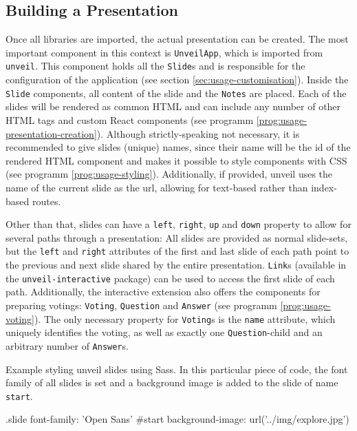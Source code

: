\subsection{Building a Presentation}
\label{sec:usage-components}

Once all libraries are imported, the actual presentation can be created. The most important component in this context is \texttt{UnveilApp}, which is imported from \texttt{unveil}. This component holds all the \texttt{Slide}s and is responsible for the configuration of the application (see section \ref{sec:usage-customisation}). Inside the \texttt{Slide} components, all content of the slide and the \texttt{Notes} are placed. Each of the slides will be rendered as common HTML and can include any number of other HTML tags and custom React components (see programm \ref{prog:usage-presentation-creation}). Although strictly-speaking not necessary, it is recommended to give slides (unique) names, since their name will be the id of the rendered HTML component and makes it possible to style components with CSS (see programm \ref{prog:usage-styling}). Additionally, if provided, unveil uses the name of the current slide as the url, allowing for text-based rather than index-based routes.

Other than that, slides can have a \texttt{left}, \texttt{right}, \texttt{up} and \texttt{down} property to allow for several paths through a presentation: All slides are provided as normal slide-sets, but the \texttt{left} and \texttt{right} attributes of the first and last slide of each path point to the previous and next slide shared by the entire presentation. \texttt{Link}s (available in the \texttt{unveil-interactive} package) can be used to access the first slide of each path. Additionally, the interactive extension also offers the components for preparing votings: \texttt{Voting}, \texttt{Question} and \texttt{Answer} (see programm \ref{prog:usage-voting}). The only necessary property for \texttt{Voting}s is the \texttt{name} attribute, which uniquely identifies the voting, as well as exactly one \texttt{Question}-child and an arbitrary number of \texttt{Answer}s.

\begin{program}
\caption{Example styling unveil slides using Sass. In this particular piece of code, the font family of all slides is set and a background image is added to the slide of name \texttt{start}.}
\label{prog:usage-styling}
\begin{CssCode}
.slide
  font-family: 'Open Sans'
#start
  background-image: url('../img/explore.jpg')
\end{CssCode}
\end{program}

